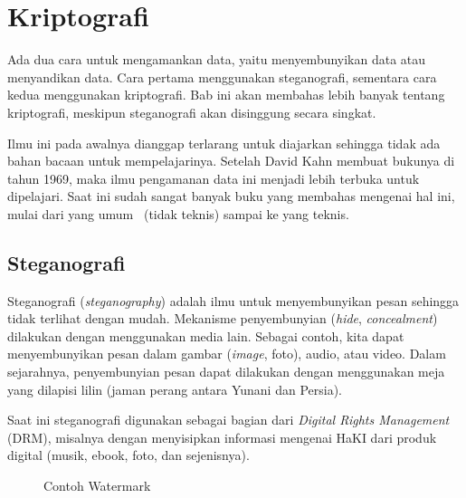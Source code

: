 \chapter{Kriptografi}
Ada dua cara untuk mengamankan data, yaitu menyembunyikan data atau menyandikan
data. Cara pertama menggunakan steganografi, sementara cara kedua menggunakan
kriptografi. Bab ini akan membahas lebih banyak tentang kriptografi, meskipun
steganografi akan disinggung secara singkat.

Ilmu ini pada awalnya dianggap terlarang untuk diajarkan sehingga tidak ada
bahan bacaan untuk mempelajarinya. Setelah David Kahn membuat bukunya di tahun
1969, maka ilmu pengamanan data ini menjadi lebih terbuka untuk dipelajari.
Saat ini sudah sangat banyak buku yang membahas mengenai hal ini, mulai dari
yang umum~\cite{levycrypto} (tidak teknis) sampai ke yang teknis.


\section{Steganografi}
Steganografi ({\em steganography}) adalah ilmu untuk menyembunyikan pesan
sehingga tidak terlihat dengan mudah. Mekanisme penyembunyian ({\em hide}, {\em
concealment}) dilakukan dengan menggunakan media lain. Sebagai contoh, kita
dapat menyembunyikan pesan dalam gambar ({\em image}, foto), audio, atau video.
Dalam sejarahnya, penyembunyian pesan dapat dilakukan dengan menggunakan meja
yang dilapisi lilin (jaman perang antara Yunani dan Persia).

Saat ini steganografi digunakan sebagai bagian dari {\em Digital Rights
Management} (DRM), misalnya dengan menyisipkan informasi mengenai HaKI dari
produk digital (musik, ebook, foto, dan sejenisnya).

\begin{figure}[ht]
\caption{Contoh Watermark}
\label{fig:watermark}
\end{figure}

